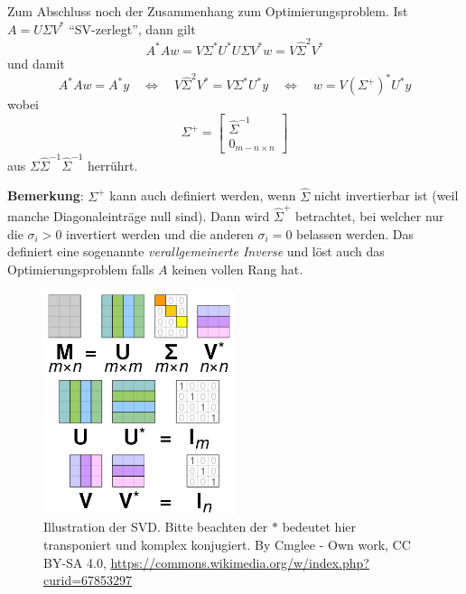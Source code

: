 \documentclass[]{book}
\theoremstyle{definition}
\theoremstyle{definition}
\theoremstyle{definition}
\theoremstyle{definition}
\theoremstyle{remark}
\begin{document}
Zum Abschluss noch der Zusammenhang zum Optimierungsproblem. Ist \(A=U\Sigma V^*\) ``SV-zerlegt'', dann gilt
\begin{equation*}
A^*Aw = V\Sigma^*U^*U\Sigma V^*w = V\hat \Sigma^2 V^* 
\end{equation*}
und damit
\begin{equation*}
A^*Aw = A^*y \quad \Leftrightarrow \quad V\hat \Sigma^2 V^*  = V\Sigma^*U^*y \quad \Leftrightarrow \quad w = V(\Sigma^+)^*U^*y
\end{equation*}
wobei
\begin{equation*}
\Sigma^+ = \begin{bmatrix}
\hat \Sigma^{-1} \\ 0_{m-n \times n}
\end{bmatrix}
\end{equation*}
aus \(\Sigma \hat \Sigma^{-1}\hat \Sigma^{-1}\) herrührt.

\textbf{Bemerkung}: \(\Sigma^+\) kann auch definiert werden, wenn \(\hat \Sigma\) nicht invertierbar ist (weil manche Diagonaleinträge null sind). Dann wird \(\hat \Sigma^+\) betrachtet, bei welcher nur die \(\sigma_i>0\) invertiert werden und die anderen \(\sigma_i=0\) belassen werden. Das definiert eine sogenannte \emph{verallgemeinerte Inverse} und löst auch das Optimierungsproblem falls \(A\) keinen vollen Rang hat.

\begin{figure}
\hypertarget{SVD}{%
\centering
\includegraphics[width=0.5\textwidth,height=\textheight]{bilder/03-412px-Singular_value_decomposition_visualisation.svg.png}
\caption{Illustration der SVD. Bitte beachten der \(*\) bedeutet hier transponiert und komplex konjugiert. By Cmglee - Own work, CC BY-SA 4.0, \url{https://commons.wikimedia.org/w/index.php?curid=67853297}}\label{SVD}
}
\end{figure}
\end{document}
